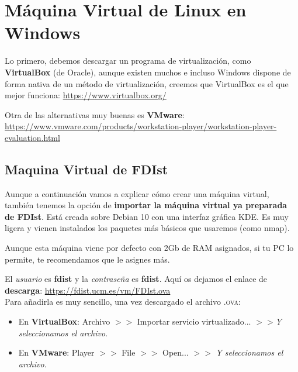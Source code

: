 \newpage
\section{Máquina Virtual de Linux en Windows}
Lo primero, debemos descargar un programa de virtualización, como \textbf{VirtualBox} (de Oracle), aunque existen muchos e incluso Windows dispone de forma nativa de un método de virtualización, creemos que VirtualBox es el que mejor funciona:
\newline \url{https://www.virtualbox.org/}

\noindent
\newline Otra de las alternativas muy buenas es \textbf{VMware}:
\newline \url{https://www.vmware.com/products/workstation-player/workstation-player-evaluation.html}

\subsection{Maquina Virtual de FDIst}
\noindent
Aunque a continuación vamos a explicar cómo crear una máquina virtual, también tenemos la opción de \textbf{importar la máquina virtual ya preparada de FDIst}.
\newline Está creada sobre Debian 10 con una interfaz gráfica KDE. Es muy ligera y vienen instalados los paquetes más básicos que usaremos (como nmap).

\noindent
\newline Aunque esta máquina viene por defecto con 2Gb de RAM asignados, si tu PC lo permite, te recomendamos que le asignes más.

\noindent
\newline El \textit{usuario} es \textbf{fdist} y la \textit{contraseña} es \textbf{fdist}.
\newline Aquí os dejamos el enlace de \textbf{descarga}: \url{https://fdist.ucm.es/vm/FDIst.ova}\\

\noindent
Para añadirla es muy sencillo, una vez descargado el archivo \textsc{.ova}:
    \begin{itemize}
        \item En \textbf{VirtualBox}: Archivo $>$$>$ Importar servicio virtualizado... $>$$>$\textit{Y seleccionamos el archivo}.
        \item En \textbf{VMware}: Player $>$$>$ File $>$$>$ Open... $>$$>$ \textit{Y seleccionamos el archivo}.
    \end{itemize}

